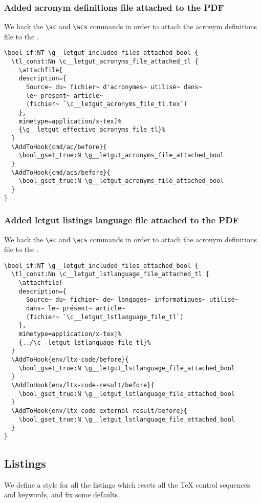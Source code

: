\documentclass{letgut}
\begin{document}
\subsubsection{Added acronym definitions file attached to the PDF}
\label{ImplementationMiscellanousAddedbibliographicressourcesattachedtothePDF-l4e34ja00pj0}
We hack the \lstinline+\ac+ and \lstinline+\acs+ commands in order to attach the acronym definitions
file to the \pdf{}.

\begin{lstlisting}
\bool_if:NT \g__letgut_included_files_attached_bool {
  \tl_const:Nn \c__letgut_acronyms_file_attached_tl {
    \attachfile[
    description={
      Source~ du~ fichier~ d'acronymes~ utilisé~ dans~
      le~ présent~ article~
      (fichier~ `\c__letgut_acronyms_file_tl.tex`)
    },
    mimetype=application/x-tex]%
    {\g__letgut_effective_acronyms_file_tl}%
  }
  \AddToHook{cmd/ac/before}{
    \bool_gset_true:N \g__letgut_acronyms_file_attached_bool
  }
  \AddToHook{cmd/acs/before}{
    \bool_gset_true:N \g__letgut_acronyms_file_attached_bool
  }
}
\end{lstlisting}

\subsubsection{Added letgut listings language file attached to the PDF}
\label{ImplementationMiscellanousAddedbibliographicressourcesattachedtothePDF-l4e34ja00pj0}
We hack the \lstinline+\ac+ and \lstinline+\acs+ commands in order to attach the acronym definitions
file to the \pdf{}.

\begin{lstlisting}
\bool_if:NT \g__letgut_included_files_attached_bool {
  \tl_const:Nn \c__letgut_lstlanguage_file_attached_tl {
    \attachfile[
    description={
      Source~ du~ fichier~ de~ langages~ informatiques~ utilisé~
      dans~ le~ présent~ article~
      (fichier~ `\c__letgut_lstlanguage_file_tl`)
    },
    mimetype=application/x-tex]%
    {../\c__letgut_lstlanguage_file_tl}%
  }
  \AddToHook{env/ltx-code/before}{
    \bool_gset_true:N \g__letgut_lstlanguage_file_attached_bool
  }
  \AddToHook{env/ltx-code-result/before}{
    \bool_gset_true:N \g__letgut_lstlanguage_file_attached_bool
  }
  \AddToHook{env/ltx-code-external-result/before}{
    \bool_gset_true:N \g__letgut_lstlanguage_file_attached_bool
  }
}
\end{lstlisting}

\subsection{Listings}
\label{ImplementationListings-514h55h0jlj0}
We define a style for all the listings which resets all the \TeX{} control
sequences and keywords, and fix some defaults.
\end{document}

